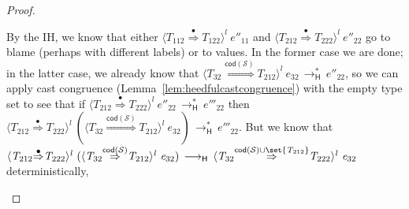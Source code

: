\documentclass[9pt]{extarticle}
\newcommand{\ottnt}[1]{\mathit{#1}}
\begin{document}
{\begin{lemma}
\begin{proof}
{\begin{itemize}
\begin{itemize}
        By the IH, we know that either $ \langle  \ottnt{T_{{\mathrm{112}}}}  \mathord{ \overset{\bullet}{\Rightarrow} }  \ottnt{T_{{\mathrm{122}}}}  \rangle^{ \ottnt{l} } ~  \ottnt{e''_{{\mathrm{11}}}} $ and
        $ \langle  \ottnt{T_{{\mathrm{212}}}}  \mathord{ \overset{\bullet}{\Rightarrow} }  \ottnt{T_{{\mathrm{222}}}}  \rangle^{ \ottnt{l} } ~  \ottnt{e''_{{\mathrm{22}}}} $ go to blame (perhaps with different
        labels) or to values. In the former case we are done; in the
        latter case, we already know that $ \langle  \ottnt{T_{{\mathrm{32}}}}  \mathord{ \overset{  \mathsf{cod} ( \mathcal{S} )  }{\Rightarrow} }  \ottnt{T_{{\mathrm{212}}}}  \rangle^{ \ottnt{l} } ~  \ottnt{e_{{\mathrm{32}}}}  \,  \longrightarrow ^{*}_{  \mathsf{H}  }  \, \ottnt{e''_{{\mathrm{22}}}}$, so we can apply cast congruence
        (Lemma~\ref{lem:heedfulcastcongruence}) with the empty type
        set to see that if $ \langle  \ottnt{T_{{\mathrm{212}}}}  \mathord{ \overset{\bullet}{\Rightarrow} }  \ottnt{T_{{\mathrm{222}}}}  \rangle^{ \ottnt{l} } ~  \ottnt{e''_{{\mathrm{22}}}}  \,  \longrightarrow ^{*}_{  \mathsf{H}  }  \, \ottnt{e'''_{{\mathrm{22}}}}$ then
        $ \langle  \ottnt{T_{{\mathrm{212}}}}  \mathord{ \overset{\bullet}{\Rightarrow} }  \ottnt{T_{{\mathrm{222}}}}  \rangle^{ \ottnt{l} } ~   (  \langle  \ottnt{T_{{\mathrm{32}}}}  \mathord{ \overset{  \mathsf{cod} ( \mathcal{S} )  }{\Rightarrow} }  \ottnt{T_{{\mathrm{212}}}}  \rangle^{ \ottnt{l} } ~  \ottnt{e_{{\mathrm{32}}}}  )   \,  \longrightarrow ^{*}_{  \mathsf{H}  }  \, \ottnt{e'''_{{\mathrm{22}}}}$.
But we know that $ \langle  \ottnt{T_{{\mathrm{212}}}}  \mathord{ \overset{\bullet}{\Rightarrow} }  \ottnt{T_{{\mathrm{222}}}}  \rangle^{ \ottnt{l} } ~   (  \langle  \ottnt{T_{{\mathrm{32}}}}  \mathord{ \overset{  \mathsf{cod} ( \mathcal{S} )  }{\Rightarrow} }  \ottnt{T_{{\mathrm{212}}}}  \rangle^{ \ottnt{l} } ~  \ottnt{e_{{\mathrm{32}}}}  )   \,  \longrightarrow _{  \mathsf{H}  }  \,  \langle  \ottnt{T_{{\mathrm{32}}}}  \mathord{ \overset{   \mathsf{cod} ( \mathcal{S} )   \cup   \set{  \ottnt{T_{{\mathrm{212}}}}  }   }{\Rightarrow} }  \ottnt{T_{{\mathrm{222}}}}  \rangle^{ \ottnt{l} } ~  \ottnt{e_{{\mathrm{32}}}} $ deterministically,

\end{itemize}
\end{itemize}}
\end{proof}
\end{lemma}}
\end{document}
